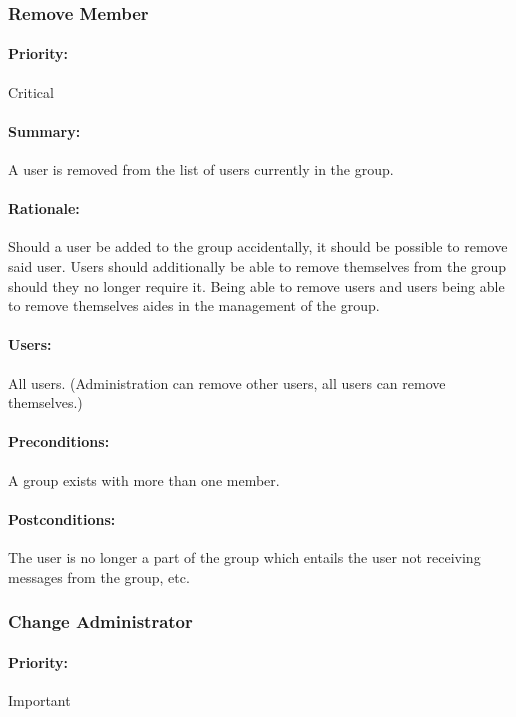 \documentclass[11pt]{article}
\begin{document}
\subsubsection{Remove Member} \label{UC-remove-member}
\paragraph{Priority:} Critical
\paragraph{Summary:}
A user is removed from the list of users currently in the group.
\paragraph{Rationale:}
Should a user be added to the group accidentally, it should be possible to remove said user. Users should additionally be able to remove themselves from the group should they no longer require it. Being able to remove users and users being able to remove themselves aides in the management of the group.
\paragraph{Users:}
All users. (Administration can remove other users, all users can remove themselves.)
\paragraph{Preconditions:}
A group exists with more than one member.
\paragraph{{Postconditions:}}
The user is no longer a part of the group which entails the user not receiving messages from the group, etc.

\subsubsection{Change Administrator} \label{UC-change-admin}
\paragraph{Priority:} Important
\end{document}
